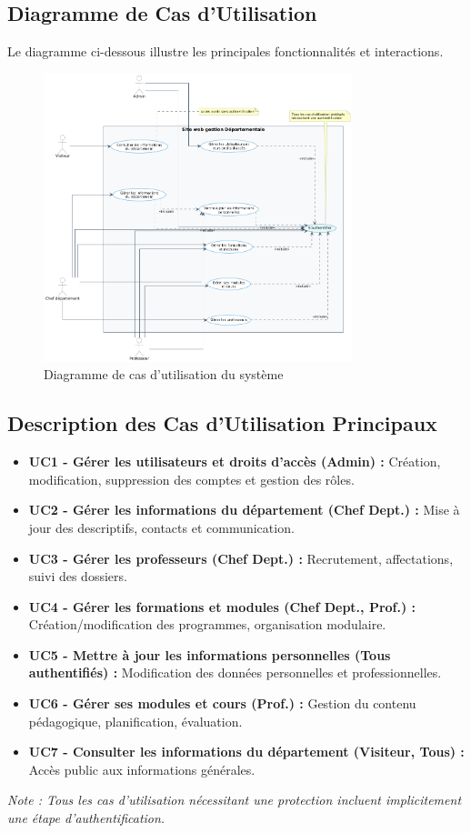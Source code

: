 \subsection{Diagramme de Cas d'Utilisation}
Le diagramme ci-dessous illustre les principales fonctionnalités et interactions.

\begin{figure}[H]
    \centering
    \includegraphics[width=0.8\textwidth]{diagrams/use_case.png} %
    \caption{Diagramme de cas d'utilisation du système}
    \label{fig:use-case-diagram-condensed}
\end{figure}

\subsection{Description des Cas d'Utilisation Principaux}
\begin{itemize}
    \item \textbf{UC1 - Gérer les utilisateurs et droits d'accès (Admin) :} Création, modification, suppression des comptes et gestion des rôles.
    \item \textbf{UC2 - Gérer les informations du département (Chef Dept.) :} Mise à jour des descriptifs, contacts et communication.
    \item \textbf{UC3 - Gérer les professeurs (Chef Dept.) :} Recrutement, affectations, suivi des dossiers.
    \item \textbf{UC4 - Gérer les formations et modules (Chef Dept., Prof.) :} Création/modification des programmes, organisation modulaire.
    \item \textbf{UC5 - Mettre à jour les informations personnelles (Tous authentifiés) :} Modification des données personnelles et professionnelles.
    \item \textbf{UC6 - Gérer ses modules et cours (Prof.) :} Gestion du contenu pédagogique, planification, évaluation.
    \item \textbf{UC7 - Consulter les informations du département (Visiteur, Tous) :} Accès public aux informations générales.
\end{itemize}
\textit{Note : Tous les cas d'utilisation nécessitant une protection incluent implicitement une étape d'authentification.}

